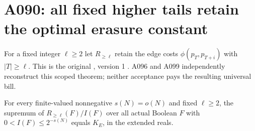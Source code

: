\section{A090: all fixed higher tails retain the optimal erasure constant}
\label{sec:tail}
For a fixed integer $\ell\ge2$ let $R_{\ge\ell}$ retain the edge costs
$\phi(p_T,p_{T+i})$ with $|T|\ge\ell$. This is the original
, version 1
\cite{A090c}. A096 and A099 independently reconstruct this scoped theorem;
neither acceptance pays the resulting universal bill.
\begin{theorem}\label{thm:tail}
For every finite-valued nonnegative $s(N)=o(N)$ and fixed $\ell\ge2$,
the supremum of $R_{\ge\ell}(F)/I(F)$ over all actual Boolean $F$
with $0<I(F)\le2^{-s(N)}$ equals $K_E$, in the extended reals.
\end{theorem}
